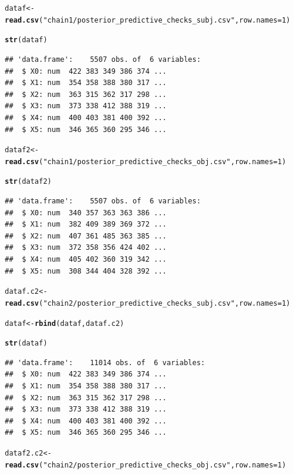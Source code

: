 \documentclass{article}\usepackage[]{graphicx}\usepackage[]{color}
\makeatletter
\newcommand{\hlnum}[1]{\textcolor[rgb]{0.686,0.059,0.569}{#1}}%
\newcommand{\hlstr}[1]{\textcolor[rgb]{0.192,0.494,0.8}{#1}}%
\newcommand{\hlstd}[1]{\textcolor[rgb]{0.345,0.345,0.345}{#1}}%
\newcommand{\hlkwb}[1]{\textcolor[rgb]{0.69,0.353,0.396}{#1}}%
\newcommand{\hlkwc}[1]{\textcolor[rgb]{0.333,0.667,0.333}{#1}}%
\newcommand{\hlkwd}[1]{\textcolor[rgb]{0.737,0.353,0.396}{\textbf{#1}}}%
\newenvironment{kframe}{%
 \def\at@end@of@kframe{}%
 \ifinner\ifhmode%
  \def\at@end@of@kframe{\end{minipage}}%
  \begin{minipage}{\columnwidth}%
 \fi\fi%
 \def\FrameCommand##1{\hskip\@totalleftmargin \hskip-\fboxsep
 \colorbox{shadecolor}{##1}\hskip-\fboxsep
     \hskip-\linewidth \hskip-\@totalleftmargin \hskip\columnwidth}%
 \MakeFramed {\advance\hsize-\width
   \@totalleftmargin\z@ \linewidth\hsize
   \@setminipage}}%
 {\par\unskip\endMakeFramed%
 \at@end@of@kframe}
\newenvironment{knitrout}{}{} %
\makeatother
\begin{document}
\begin{knitrout}
\color{fgcolor}\begin{kframe}
\begin{alltt}
\hlstd{dataf} \hlkwb{<-} \hlkwd{read.csv}\hlstd{(}\hlstr{"chain1/posterior_predictive_checks_subj.csv"}\hlstd{,} \hlkwc{row.names} \hlstd{=} \hlnum{1}\hlstd{)}

\hlkwd{str}\hlstd{(dataf)}
\end{alltt}
\begin{verbatim}
## 'data.frame':	5507 obs. of  6 variables:
##  $ X0: num  422 383 349 386 374 ...
##  $ X1: num  354 358 388 380 317 ...
##  $ X2: num  363 315 362 317 298 ...
##  $ X3: num  373 338 412 388 319 ...
##  $ X4: num  400 403 381 400 392 ...
##  $ X5: num  346 365 360 295 346 ...
\end{verbatim}
\begin{alltt}
\hlstd{dataf2} \hlkwb{<-} \hlkwd{read.csv}\hlstd{(}\hlstr{"chain1/posterior_predictive_checks_obj.csv"}\hlstd{,} \hlkwc{row.names} \hlstd{=} \hlnum{1}\hlstd{)}

\hlkwd{str}\hlstd{(dataf2)}
\end{alltt}
\begin{verbatim}
## 'data.frame':	5507 obs. of  6 variables:
##  $ X0: num  340 357 363 363 386 ...
##  $ X1: num  382 409 389 369 372 ...
##  $ X2: num  407 361 485 363 385 ...
##  $ X3: num  372 358 356 424 402 ...
##  $ X4: num  405 402 360 319 342 ...
##  $ X5: num  308 344 404 328 392 ...
\end{verbatim}
\begin{alltt}
\hlstd{dataf.c2} \hlkwb{<-} \hlkwd{read.csv}\hlstd{(}\hlstr{"chain2/posterior_predictive_checks_subj.csv"}\hlstd{,} \hlkwc{row.names} \hlstd{=} \hlnum{1}\hlstd{)}

\hlstd{dataf} \hlkwb{<-} \hlkwd{rbind}\hlstd{(dataf, dataf.c2)}

\hlkwd{str}\hlstd{(dataf)}
\end{alltt}
\begin{verbatim}
## 'data.frame':	11014 obs. of  6 variables:
##  $ X0: num  422 383 349 386 374 ...
##  $ X1: num  354 358 388 380 317 ...
##  $ X2: num  363 315 362 317 298 ...
##  $ X3: num  373 338 412 388 319 ...
##  $ X4: num  400 403 381 400 392 ...
##  $ X5: num  346 365 360 295 346 ...
\end{verbatim}
\begin{alltt}
\hlstd{dataf2.c2} \hlkwb{<-} \hlkwd{read.csv}\hlstd{(}\hlstr{"chain2/posterior_predictive_checks_obj.csv"}\hlstd{,} \hlkwc{row.names} \hlstd{=} \hlnum{1}\hlstd{)}


\end{alltt}
\end{kframe}
\end{knitrout}
\end{document}
